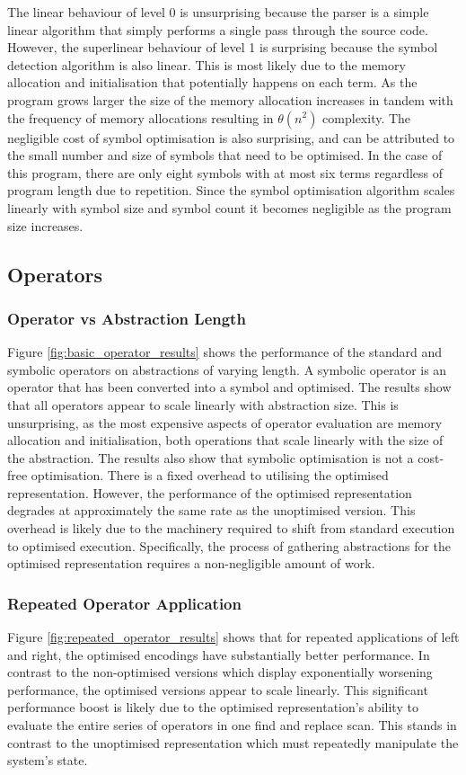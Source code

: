 The linear behaviour of level 0 is unsurprising because the parser is a simple linear algorithm that simply performs a single pass through the source code. However, the superlinear behaviour of level 1 is surprising because the symbol detection algorithm is also linear. This is most likely due to the memory allocation and initialisation that potentially happens on each term. As the program grows larger the size of the memory allocation increases in tandem with the frequency of memory allocations resulting in $\theta(n^2)$ complexity. The negligible cost of symbol optimisation is also surprising, and can be attributed to the small number and size of symbols that need to be optimised. In the case of this program, there are only eight symbols with at most six terms regardless of program length due to repetition. Since the symbol optimisation algorithm scales linearly with symbol size and symbol count it becomes negligible as the program size increases.

\subsection{Operators}
\subsubsection{Operator vs Abstraction Length}

Figure \ref{fig:basic_operator_results} shows the performance of the standard and symbolic operators on abstractions of varying length. A symbolic operator is an operator that has been converted into a symbol and optimised. The results show that all operators appear to scale linearly with abstraction size. This is unsurprising, as the most expensive aspects of operator evaluation are memory allocation and initialisation, both operations that scale linearly with the size of the abstraction. The results also show that symbolic optimisation is not a cost-free optimisation. There is a fixed overhead to utilising the optimised representation. However, the performance of the optimised representation degrades at approximately the same rate as the unoptimised version. This overhead is likely due to the machinery required to shift from standard execution to optimised execution. Specifically, the process of gathering abstractions for the optimised representation requires a non-negligible amount of work.

\subsubsection{Repeated Operator Application}

Figure \ref{fig:repeated_operator_results} shows that for repeated applications of left and right, the optimised encodings have substantially better performance. In contrast to the non-optimised versions which display exponentially worsening performance, the optimised versions appear to scale linearly. This significant performance boost is likely due to the optimised representation's ability to evaluate the entire series of operators in one find and replace scan. This stands in contrast to the unoptimised representation which must repeatedly manipulate the system's state.

